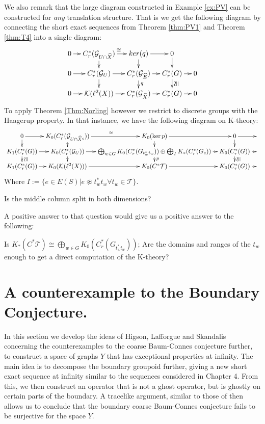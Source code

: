 \begin{example}
We also remark that the large diagram constructed in Example \ref{ex:PV} can be constructed for \textit{any} translation structure. That is we get the following diagram by connecting the short exact sequences from Theorem \ref{thm:PV1} and Theorem \ref{thm:T4} into a single diagram:
$$
\xymatrix@=1em{ 0 \ar[r] & C^{*}_{r}(\G_{U\cap \X}) \ar[d]\ar[r]^{\cong} & ker(q)\ar[d] \ar[r] & 0 \ar[d]&  \\
0 \ar[r] & C^{*}_{r}(\G_{U}) \ar[d] \ar[r] & C^{*}_{r}(\G_{\E}) \ar[d]^{q} \ar[r] & C^{*}_{r}(G) \ar[d]^{\ucong}\ar[r] & 0\\
0 \ar[r] & \mathcal{K}(\ell^{2}(X)) \ar[r] & C^{*}_{r}(\G_{\X}) \ar[r] & C^{*}_{r}(G) \ar[r] & 0
}
$$
To apply Theorem \ref{Thm:Norling} however we restrict to discrete groups with the Haagerup property. In that instance, we have the following diagram on K-theory:
$$
\xymatrix@=0.7em{ 0 \ar[r]\ar[d] & K_{0}(C^{*}_{r}(\G_{U\cap \widehat{X}^{c}}))\ar[d] \ar[r]^{\cong}& K_{0}(\ker p) \ar[r]\ar[d]& 0 \ar[r]\ar[d] & \\
K_{1}(C^{*}_{r}(G)) \ar[r]\ar[d]^{\ucong} & K_{0}(C^{*}_{r}(\G_{U}))\ar[r]\ar[d]&\bigoplus_{w \in G} K_{0}(C^{*}_{r}(G_{t_{w}^{*}t_{w}})) \oplus \bigoplus_{I} K_{*}(C^{*}_{r}(G_{e}))\ar[r]\ar[d]^{p}& K_{0}(C^{*}_{r}(G))\ar[r]\ar[d]^{\ucong} &  \\
K_{1}(C^{*}_{r}(G)) \ar[r]& K_{0}(\mathcal{K}(\ell^{2}(X))) \ar[r]& K_{0}(C^{*}\mathcal{T}) \ar[r]& K_{0}(C^{*}_{r}(G)) \ar[r]&  
}
$$
Where $I:= \lbrace e \in E(S) | e \not \approx t^{*}_{w}t_{w} \forall t_{w} \in \mathcal{T} \rbrace.$
 
\begin{question}
Is the middle column split in both dimensions?
\end{question}

A positive answer to that question would give us a positive answer to the following:

\begin{question}
Is $K_{*}(C^{*}\mathcal{T}) \cong \bigoplus_{w \in G} K_{0}(C^{*}_{r}(G_{t_{w}^{*}t_{w}}))$; Are the domains and ranges of the $t_{w}$ enough to get a direct computation of the K-theory?
\end{question}

\section{A counterexample to the Boundary Conjecture.}
In this section we develop the ideas of Higson, Lafforgue and Skandalis concerning the counterexamples to the coarse Baum-Connes conjecture further, to construct a space of graphs $Y$ that has exceptional properties at infinity. The main idea is to decompose the boundary groupoid further, giving a new short exact sequence at infinity similar to the sequences considered in Chapter 4. From this, we then construct an operator that is not a ghost operator, but is ghostly on certain parts of the boundary. A tracelike argument, similar to those of \cite{higsonpreprint, explg1} then allows us to conclude that the boundary coarse Baum-Connes conjecture fails to be surjective for the space $Y$.


\end{example}
